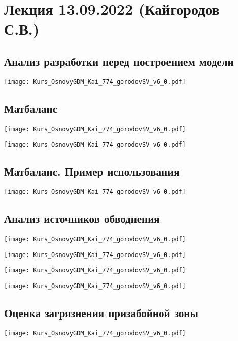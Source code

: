 \documentclass[main.tex]{subfiles}
\begin{document}
\section{Лекция 13.09.2022 (Кайгородов С.В.)}

\subsection{Анализ разработки перед построением модели}

\texttt{[image: Kurs\_OsnovyGDM\_Kai\_774\_gorodovSV\_v6\_0.pdf]}

\subsection{Матбаланс}

\texttt{[image: Kurs\_OsnovyGDM\_Kai\_774\_gorodovSV\_v6\_0.pdf]}

\texttt{[image: Kurs\_OsnovyGDM\_Kai\_774\_gorodovSV\_v6\_0.pdf]}

\subsection{Матбаланс. Пример использования}

\texttt{[image: Kurs\_OsnovyGDM\_Kai\_774\_gorodovSV\_v6\_0.pdf]}

\subsection{Анализ источников обводнения}

\texttt{[image: Kurs\_OsnovyGDM\_Kai\_774\_gorodovSV\_v6\_0.pdf]}

\texttt{[image: Kurs\_OsnovyGDM\_Kai\_774\_gorodovSV\_v6\_0.pdf]}

\texttt{[image: Kurs\_OsnovyGDM\_Kai\_774\_gorodovSV\_v6\_0.pdf]}

\texttt{[image: Kurs\_OsnovyGDM\_Kai\_774\_gorodovSV\_v6\_0.pdf]}

\subsection{Оценка загрязнения призабойной зоны}

\texttt{[image: Kurs\_OsnovyGDM\_Kai\_774\_gorodovSV\_v6\_0.pdf]}
\end{document}
